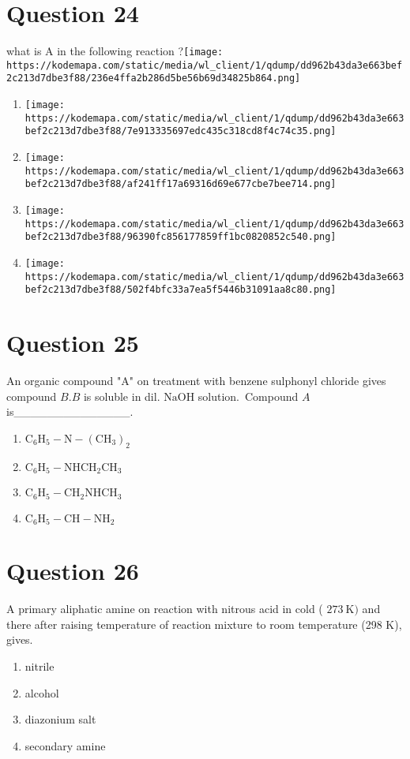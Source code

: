 \documentclass{article}
\begin{document}
\section*{Question 24}
what is A in the following reaction ?\texttt{[image: https://kodemapa.com/static/media/wl\_client/1/qdump/dd962b43da3e663bef2c213d7dbe3f88/236e4ffa2b286d5be56b69d34825b864.png]}\newline
\begin{enumerate}[label=(\alph*)]
\item \texttt{[image: https://kodemapa.com/static/media/wl\_client/1/qdump/dd962b43da3e663bef2c213d7dbe3f88/7e913335697edc435c318cd8f4c74c35.png]}
\item \texttt{[image: https://kodemapa.com/static/media/wl\_client/1/qdump/dd962b43da3e663bef2c213d7dbe3f88/af241ff17a69316d69e677cbe7bee714.png]}
\item \texttt{[image: https://kodemapa.com/static/media/wl\_client/1/qdump/dd962b43da3e663bef2c213d7dbe3f88/96390fc856177859ff1bc0820852c540.png]}
\item \texttt{[image: https://kodemapa.com/static/media/wl\_client/1/qdump/dd962b43da3e663bef2c213d7dbe3f88/502f4bfc33a7ea5f5446b31091aa8c80.png]}
\end{enumerate}
\newpage
\section*{Question 25}
An organic compound "A" on treatment with benzene sulphonyl chloride gives compound \(B . B\) is soluble in dil. \(\mathrm{NaOH}\) solution. Compound \(A\) is______________. 
\begin{enumerate}[label=(\alph*)]
\item \(\mathrm{C}_6 \mathrm{H}_5-\mathrm{N}-\left(\mathrm{CH}_3\right)_2\)
\item \(\mathrm{C}_6 \mathrm{H}_5-\mathrm{NHCH}_2 \mathrm{CH}_3\)
\item \(\mathrm{C}_6 \mathrm{H}_5-\mathrm{CH}_2 \mathrm{NHCH}_3\)
\item \(\mathrm{C}_6 \mathrm{H}_5-\mathrm{CH}-\mathrm{NH}_2\)
\end{enumerate}
\newpage
\section*{Question 26}
A primary aliphatic amine on reaction with nitrous acid in cold ( \(273 \mathrm{~K})\) and there after raising temperature of reaction mixture to room temperature (298 K), gives.
\begin{enumerate}[label=(\alph*)]
\item nitrile
\item alcohol
\item diazonium salt
\item secondary amine
\end{enumerate}
\newpage
\end{document}
